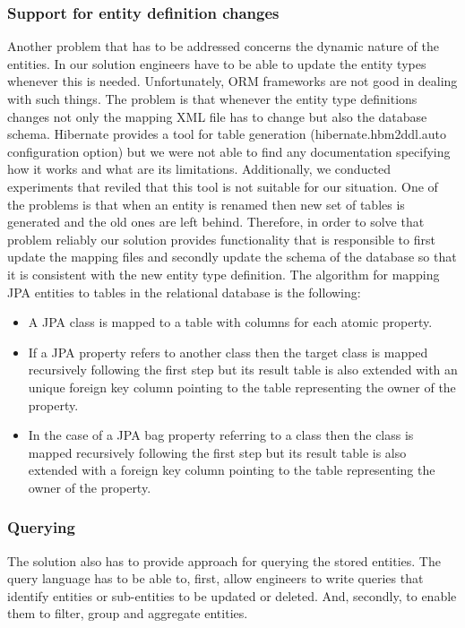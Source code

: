 \subsubsection{Support for entity definition changes}

Another problem that has to be addressed concerns the dynamic nature of the entities. In our solution engineers have to be able to update the entity types whenever this is needed. Unfortunately, ORM frameworks are not good in dealing with such things. The problem is that whenever the entity type definitions changes not only the mapping XML file has to change but also the database schema. Hibernate provides a tool for table generation (hibernate.hbm2ddl.auto configuration option) but we were not able to find any documentation specifying how it works and what are its limitations. Additionally, we conducted experiments that reviled that this tool is not suitable for our situation. One of the problems is that when an entity is renamed then new set of tables is generated and the old ones are left behind. Therefore, in order to solve that problem reliably our solution provides functionality that is responsible to first update the mapping files and secondly update the schema of the database so that it is consistent with the new entity type definition. The algorithm for mapping JPA entities to tables in the relational database is the following:

\begin{itemize}
	\item A JPA class is mapped to a table with columns for each atomic property. 
	\item If a JPA property refers to another class then the target class is mapped recursively following the first step but its result table is also extended with an unique foreign key column pointing to the table representing the owner of the property.
	\item In the case of a JPA bag property referring to a class then the class is mapped recursively following the first step but its result table is also extended with a foreign key column pointing to the table representing the owner of the property.
\end{itemize}
 

\subsubsection{Querying}

The solution also has to provide approach for querying the stored entities. The query language has to be able to, first, allow engineers to write queries that identify entities or sub-entities to be updated or deleted. And, secondly, to enable them to filter, group and aggregate entities. 

